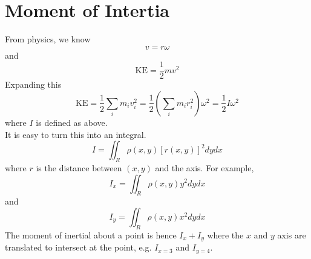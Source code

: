 \documentclass[12pt]{article}
\begin{document}
\section{Moment of Intertia}

From physics, we know $$v = r\omega$$ and $$\text{KE} = \frac{1}{2}mv^2$$
Expanding this
$$\text{KE} = \frac{1}{2} \sum_i m_iv_i^2 = \frac{1}{2} \left(\sum_i m_ir_i^2\right)\omega^2 = \frac{1}{2}I\omega^2$$
where $I$ is defined as above. \\
It is easy to turn this into an integral.
$$I = \iint_R \rho(x,y) [r(x,y)]^2 dydx$$
where $r$ is the distance between $(x,y)$ and the axis. For example,
$$I_x = \iint_R \rho(x,y) y^2 dydx$$
and
$$I_y = \iint_R \rho(x,y) x^2 dydx$$
The moment of inertial about a point is hence $I_x + I_y$ where the $x$ and $y$ axis are translated to intersect at the point, e.g. $I_{x=3}$ and $I_{y=4}$.
\end{document}
